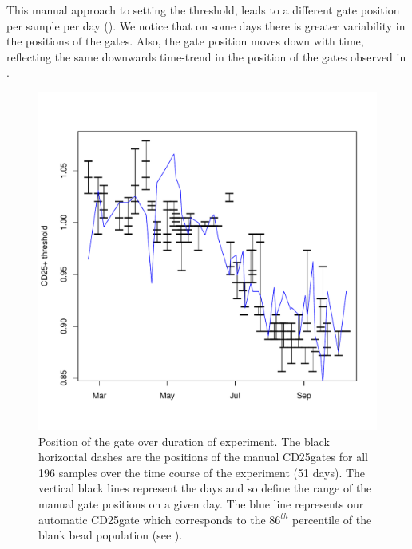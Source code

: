 


This manual approach to setting the threshold, leads to a different gate position per sample per day ().
We notice that on some days there is greater variability in the positions of the gates.
Also, the gate position moves down with time, reflecting the same downwards time-trend in the position of the gates observed in .

\begin{figure} [h]
\centering
\includegraphics[width=.5\textwidth] {figures/cd25pos-gates.pdf}
{Position of the \positive gate over duration of experiment.}
{
The black horizontal dashes are the positions of the manual CD25\positive gates for all 196 samples over the time course of the experiment (51 days).
The vertical black lines represent the days and so define the range of the manual gate positions on a given day.
The blue line represents our automatic CD25\positive gate which corresponds to the $86^{th}$ percentile of the blank bead population (see ).
}
\end{figure}


